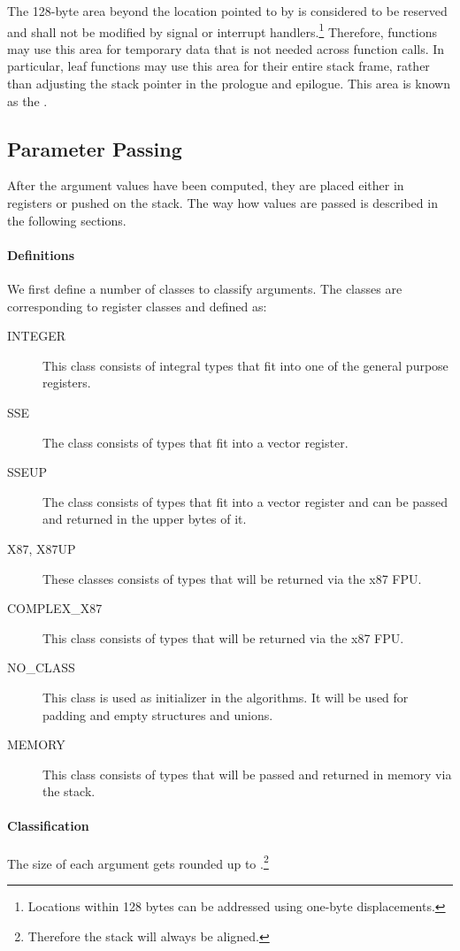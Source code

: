 The 128-byte area beyond the location pointed to by \RSP is considered
to be reserved and shall not be modified by signal or interrupt
handlers.\footnote{Locations within 128 bytes can be addressed using
  one-byte displacements.}  Therefore, functions may use this area for
temporary data that is not needed across function calls.  In
particular, leaf functions may use this area for their entire stack
frame, rather than adjusting the stack pointer in the prologue and
epilogue.  This area is known as the .

\subsection{Parameter Passing}
\label{sec-calling-conventions}

After the argument values have been computed, they are placed either in
registers or pushed on the stack.  The way how values are passed is
described in the following sections.

\paragraph{Definitions}
We first define a number of classes to classify arguments.  The
classes are corresponding to \xARCH register classes and defined as:

\begin{description}
\item[INTEGER] This class consists of integral types that fit into one of
  the general purpose registers.
\item[SSE] The class consists of types that fit into a vector register.
\item[SSEUP] The class consists of types that fit into a vector
  register and can be passed and returned in the upper bytes of it.
\item[X87, X87UP] These classes consists of types that will be returned via
  the x87 FPU.
\item[COMPLEX\_X87] This class consists of types that will be returned
  via the x87 FPU.
\item[NO\_CLASS] This class is used as initializer in the algorithms.  It
  will be used for padding and empty structures and unions.
\item[MEMORY] This class consists of types that will be passed and
  returned in memory via the stack.
\end{description}


\paragraph{Classification}
The size of each argument gets rounded up to
\eightbytes.\footnote{Therefore the stack will always be \eightbyte aligned.}

